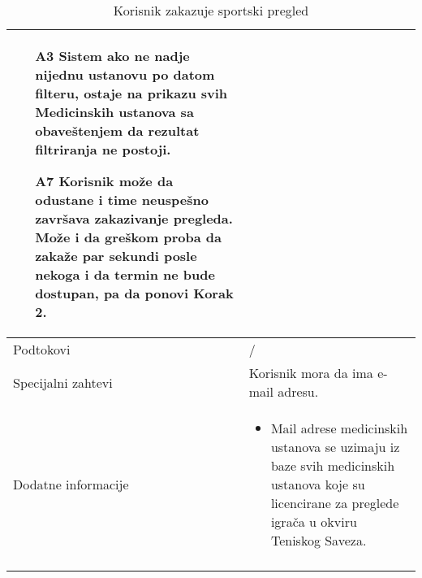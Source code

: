 \documentclass{article}
\begin{document}
\begin{longtable}{| p{} | p{} |}
\begin{itemize}
                    \item[A3] Sistem ako ne nadje nijednu ustanovu po datom filteru, ostaje na prikazu svih Medicinskih ustanova sa obaveštenjem da rezultat filtriranja ne postoji.
                    \item[A7] Korisnik može da odustane i time neuspešno završava zakazivanje pregleda. Može i da greškom proba da zakaže par sekundi posle nekoga i da termin ne bude dostupan, pa da ponovi Korak 2.
                \end{itemize}\\
            \hline
                Podtokovi & /\\
            \hline
                Specijalni zahtevi & Korisnik mora da ima e-mail adresu.\\
            \hline
                Dodatne informacije & \begin{itemize}
                    \item Mail adrese medicinskih ustanova se uzimaju iz baze svih medicinskih ustanova koje su licencirane za preglede igrača u okviru Teniskog Saveza.
                \end{itemize} \\
            \hline
            \caption{Korisnik zakazuje sportski pregled}
            \end{longtable}       
\end{document}
